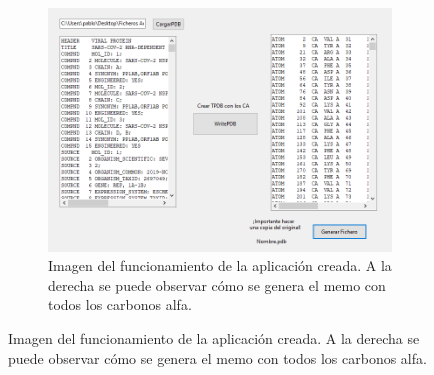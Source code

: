 \documentclass[a4paper,11pt]{report}
\begin{document}
\begin{figure}[h!]
	\centering
	\begin{subfigure}[h]{0.5\textwidth}
		\includegraphics[width=1.1\linewidth]{Figuras/Figura12}
		\caption{Imagen del funcionamiento de la aplicación creada. A la derecha se puede observar cómo se genera el memo con todos los carbonos alfa.}		
	\end{subfigure}


\end{figure}
\end{document}
